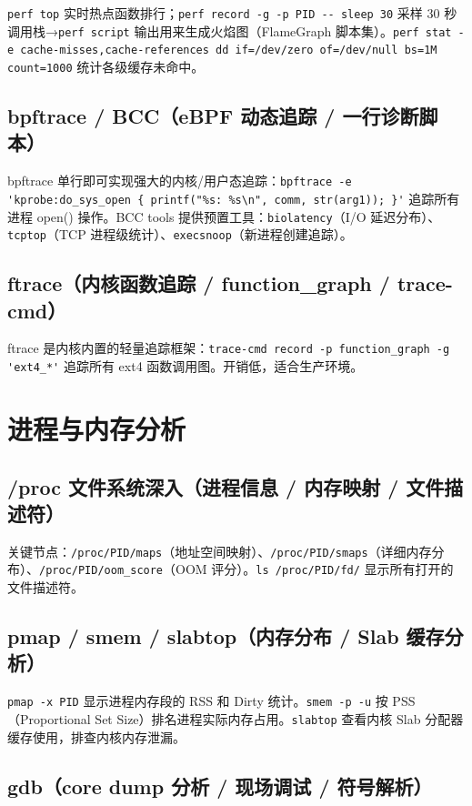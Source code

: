 \documentclass[12pt,UTF8]{ctexbook}
\begin{document}
\verb|perf top| 实时热点函数排行；\verb|perf record -g -p PID -- sleep 30| 采样 30 秒调用栈→\verb|perf script| 输出用来生成火焰图（FlameGraph 脚本集）。\verb|perf stat -e cache-misses,cache-references dd if=/dev/zero of=/dev/null bs=1M count=1000| 统计各级缓存未命中。

    \subsection{bpftrace / BCC（eBPF 动态追踪 / 一行诊断脚本）}

bpftrace 单行即可实现强大的内核/用户态追踪：\verb|bpftrace -e 'kprobe:do_sys_open { printf("%s: %s\n", comm, str(arg1)); }'| 追踪所有进程 open() 操作。BCC tools 提供预置工具：\verb|biolatency|（I/O 延迟分布）、\verb|tcptop|（TCP 进程级统计）、\verb|execsnoop|（新进程创建追踪）。

    \subsection{ftrace（内核函数追踪 / function\_graph / trace-cmd）}

ftrace 是内核内置的轻量追踪框架：\verb|trace-cmd record -p function_graph -g 'ext4_*'| 追踪所有 ext4 函数调用图。开销低，适合生产环境。

  \section{进程与内存分析}
    \subsection{/proc 文件系统深入（进程信息 / 内存映射 / 文件描述符）}

关键节点：\verb|/proc/PID/maps|（地址空间映射）、\verb|/proc/PID/smaps|（详细内存分布）、\verb|/proc/PID/oom_score|（OOM 评分）。\verb|ls /proc/PID/fd/| 显示所有打开的文件描述符。

    \subsection{pmap / smem / slabtop（内存分布 / Slab 缓存分析）}

\verb|pmap -x PID| 显示进程内存段的 RSS 和 Dirty 统计。\verb|smem -p -u| 按 PSS（Proportional Set Size）排名进程实际内存占用。\verb|slabtop| 查看内核 Slab 分配器缓存使用，排查内核内存泄漏。

    \subsection{gdb（core dump 分析 / 现场调试 / 符号解析）}
\end{document}
